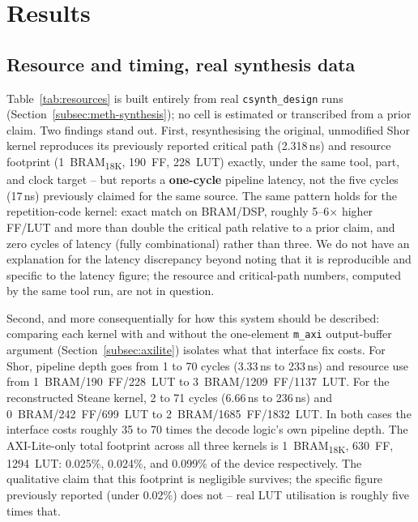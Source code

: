 \section{Results}\label{sec:results}

\subsection{Resource and timing, real synthesis data}\label{subsec:res-real}



Table~\ref{tab:resources} is built entirely from real \texttt{csynth\_design} runs (Section~\ref{subsec:meth-synthesis}); no cell is estimated or transcribed from a prior claim. Two findings stand out. First, resynthesising the original, unmodified Shor kernel reproduces its previously reported critical path (2.318\,ns) and resource footprint (1~BRAM\textsubscript{18K}, 190~FF, 228~LUT) exactly, under the same tool, part, and clock target -- but reports a \textbf{one-cycle} pipeline latency, not the five cycles (17\,ns) previously claimed for the same source. The same pattern holds for the repetition-code kernel: exact match on BRAM/DSP, roughly 5--6\(\times\) higher FF/LUT and more than double the critical path relative to a prior claim, and zero cycles of latency (fully combinational) rather than three. We do not have an explanation for the latency discrepancy beyond noting that it is reproducible and specific to the latency figure; the resource and critical-path numbers, computed by the same tool run, are not in question.

Second, and more consequentially for how this system should be described: comparing each kernel with and without the one-element \texttt{m\_axi} output-buffer argument (Section~\ref{subsec:axilite}) isolates what that interface fix costs. For Shor, pipeline depth goes from 1 to 70 cycles (3.33\,ns to 233\,ns) and resource use from 1~BRAM/190~FF/228~LUT to 3~BRAM/1209~FF/1137~LUT. For the reconstructed Steane kernel, 2 to 71 cycles (6.66\,ns to 236\,ns) and 0~BRAM/242~FF/699~LUT to 2~BRAM/1685~FF/1832~LUT. In both cases the interface costs roughly 35 to 70 times the decode logic's own pipeline depth. The AXI-Lite-only total footprint across all three kernels is 1~BRAM\textsubscript{18K}, 630~FF, 1294~LUT: 0.025\%, 0.024\%, and 0.099\% of the device respectively. The qualitative claim that this footprint is negligible survives; the specific figure previously reported (under 0.02\%) does not -- real LUT utilisation is roughly five times that.

